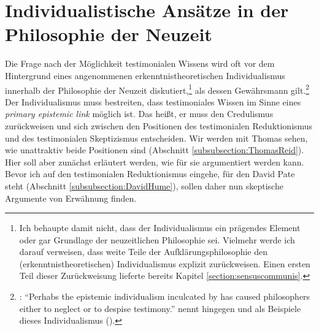 \section{Individualistische Ansätze in der Philosophie der
Neuzeit}\label{subsection:TestimonialesWissenUndMuendigkeit}
Die Frage nach der Möglichkeit testimonialen Wissens wird oft vor dem
Hintergrund eines angenommenen erkenntnistheoretischen Individualismus innerhalb der Philosophie
der Neuzeit diskutiert,\footnote{Ich behaupte damit nicht, dass der
Individualismus ein prägendes Element oder gar Grundlage der neuzeitlichen Philosophie sei.
Vielmehr werde ich darauf verweisen, dass weite Teile der
Aufklärungsphilosophie den (erkenntnistheoretischen) Individualismus explizit
zurückweisen. Einen ersten Teil dieser Zurückweisung lieferte bereits Kapitel
\ref{section:sensuscommunis}.} als dessen Gewährsmann
gilt.\footnote{\cite[Vgl.][\pno~407f.]{Welbourne:IsHumeReallyaReductivist2002}:
\enquote{Perhabs the epistemic individualism inculcated by
 has caused philosophers either to
neglect or to despise testimony.}
nennt hingegen  und  als Beispiele dieses
Individualismus (\cite[vgl.][\pno~530f.]{Grundmann:AnalytischeEinfuehrungindieErkenntnistheorie2008}).}
Der Individualismus muss bestreiten, dass testimoniales Wissen im Sinne eines
\emph{primary epistemic link} möglich ist. Das heißt, er muss den Credulismus
zurückweisen und sich zwischen den Positionen des testimonialen Reduktionismus
und des testimonialen Skeptizismus entscheiden. Wir werden mit Thomas
 sehen, wie unattraktiv beide Positionen sind (Abschnitt
\ref{subsubsection:ThomasReid}). Hier soll aber zunächst erläutert werden, wie
für sie argumentiert werden kann. Bevor ich auf den testimonialen Reduktionismus
eingehe, für den David  Pate steht (Abschnitt
\ref{subsubsection:DavidHume}), sollen daher nun skeptische Argumente von
 Erwähnung finden.




